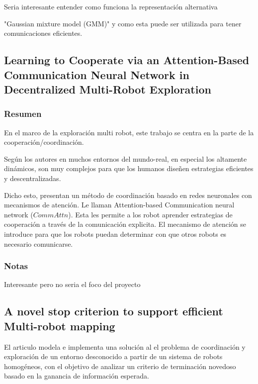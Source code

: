 Seria interesante entender como funciona la representación alternativa

"Gaussian mixture model (GMM)" y como esta puede ser utilizada para tener comunicaciones eficientes.

\subsection{Learning to Cooperate via an Attention-Based Communication Neural Network in Decentralized Multi-Robot Exploration}

\subsubsection{Resumen}
En el marco de la exploración multi robot, este trabajo se centra en la parte de la cooperación/coordinación. 

Según los autores en muchos entornos del mundo-real, en especial los altamente dinámicos, son muy complejos para que los humanos diseñen estrategias eficientes y descentralizadas.

Dicho esto, presentan un método de coordinación basado en redes neuronales con mecanismos de atención. Le llaman Attention-based Communication neural network ($CommAttn$). Esta les permite a los robot aprender estrategias de cooperación a través de la comunicación explicita. El mecanismo de atención se introduce para que los robots puedan determinar con que otros robots es necesario comunicarse.

\subsubsection{Notas}
Interesante pero no seria el foco del proyecto

\subsection{A novel stop criterion to support efficient Multi-robot mapping}\cite{amorin2019novel}
El articulo modela e implementa una solución al el problema de coordinación y exploración de un entorno desconocido a partir de un sistema de robots homogéneos, con el objetivo de analizar un criterio de terminación novedoso basado en la ganancia de información esperada.

